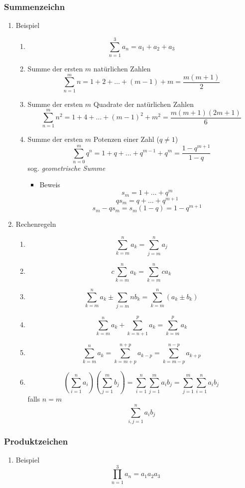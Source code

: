\documentclass[11pt]{article}
\begin{document}
\subsubsection{Summenzeichn}
\label{sec-2-1-1}
\begin{enumerate}
\item Beispiel
\label{sec-2-1-1-1}
\begin{enumerate}
\item \[\sum_{n=1}^3a_n=a_1 + a_2 + a_3\]
\item Summe der ersten $m$ natürlichen Zahlen
\[\sum_{n=1}^{m}n = 1 + 2 + \ldots + \left(m -1\right) + m = \frac{m (m + 1)}{2}\]
\item Summe der ersten $m$ Quadrate der natürlichen Zahlen
\[\sum_{n=1}^m n^2 = 1 + 4 + \ldots + \left(m-1\right)^2 + m^2 = \frac{m(m+1)(2m+1)}{6}\]
\item Summe der ersten $m$ Potenzen einer Zahl ($q \neq 1$)
\[\sum_{n=0}^m q^n = 1+q+\dots+q^{m-1}+q^m = \frac{1 - q^{m + 1}}{1-q}\]
sog. \emph{geometrische Summe}
\begin{itemize}
\item Beweis
\[s_m = 1 + \ldots + q^m\]
\[q s_m = q + \ldots + q^{m+1}\]
\[s_m - q s_m = s_m\left(1-q\right) = 1-q^{m+1}\]
\end{itemize}
\end{enumerate}

\item Rechenregeln
\label{sec-2-1-1-2}
\begin{enumerate}
\item \[\sum_{k=m}^n a_k = \sum_{j=m}^n a_j\]
\item \[c\sum_{k=m}^n a_k = \sum_{k=m}^n c a_k\]
\item \[\sum_{k=m}^n a_k \pm \sum_{j=m}{n} b_k = \sum_{k=m}^n \left(a_k \pm b_k\right)\]
\item \[\sum_{k=m}^n a_k + \sum_{k=n+1}^p a_k = \sum_{k=m}^{p} a_k\]
\item \[\sum_{k=m}^n a_k = \sum_{k=m+p}^{n+p} a_{k-p} = \sum_{k=m-p}^{n-p} a_{k+p}\]
\item \[\left(\sum_{i=1}^n a_i\right)(\sum_{j=1}^m b_j) = \sum_{i=1}^n \sum_{j=1}^m a_i b_j = \sum_{j=1}^m \sum_{i=1}^n a_i b_j\]
           falls $n=m$ \[\sum_{i,j=1}^n a_i b_j\]
\end{enumerate}
\end{enumerate}

\subsubsection{Produktzeichen}
\label{sec-2-1-2}
\begin{enumerate}
\item Beispiel
\label{sec-2-1-2-1}
\[\prod_{n=1}^3 a_n = a_1 a_2 a_3\]
\end{enumerate}
\end{document}
